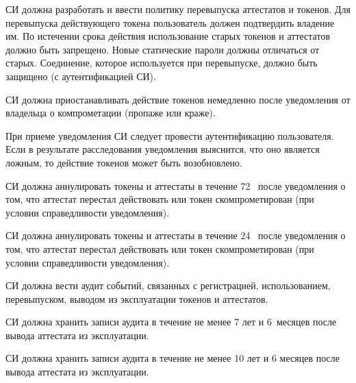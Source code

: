 СИ должна разработать и ввести политику перевыпуска аттестатов и токенов.
Для перевыпуска действующего токена пользователь должен 
подтвердить владение им. По истечении срока действия
использование старых токенов и аттестатов должно быть запрещено. 
Новые статические пароли должны отличаться от старых. 
Соединение, которое используется при перевыпуске, должно быть защищено 
(с аутентификацией СИ). 




СИ должна приостанавливать действие токенов немедленно после 
уведомления от владельца о компрометации (пропаже или краже).

\begin{note*}
При приеме уведомления СИ следует провести аутентификацию пользователя.
%
Если в результате расследования уведомления выяснится, что оно является 
ложным, то действие токенов может быть возобновлено.
\end{note*}


СИ должна аннулировать токены и аттестаты в течение 72~ 
после уведомления о том, что аттестат перестал действовать 
или токен скомпрометирован (при условии справедливости уведомления).

СИ должна аннулировать токены и аттестаты в течение 24~ 
после уведомления о том, что аттестат перестал действовать 
или токен скомпрометирован (при условии справедливости уведомления). 

СИ должна вести аудит событий, связанных с регистрацией, использованием, 
перевыпуском, выводом из эксплуатации токенов и аттестатов.  


СИ должна хранить записи аудита в течение не менее 7 лет и 6~месяцев после 
вывода аттестата из эксплуатации.  

СИ должна хранить записи аудита в течение не менее 10 лет и 6 месяцев 
после вывода аттестата из эксплуатации.  
